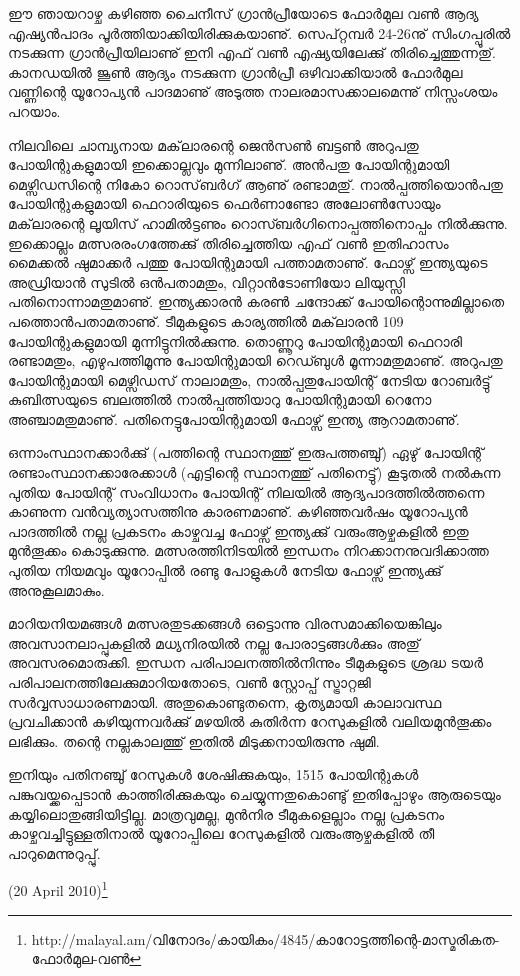 ﻿
\vskip 2pt

ഈ ഞായറാഴ്ച കഴിഞ്ഞ ചൈനീസ് ഗ്രാന്‍പ്രീയോടെ ഫോര്‍മുല വണ്‍ ആദ്യ എഷ്യന്‍പാദം പൂര്‍ത്തിയാക്കിയിരിക്കുകയാണു്. 
സെപ്റ്റമ്പര്‍ 24-26നു് സിംഗപ്പൂരില്‍ നടക്കുന്ന ഗ്രാന്‍പ്രീയിലാണു് ഇനി എഫ് വണ്‍ എഷ്യയിലേക്കു് തിരിച്ചെത്തുന്നതു്.
കാനഡയില്‍ ജൂണ്‍ ആദ്യം നടക്കുന്ന ഗ്രാന്‍പ്രീ ഒഴിവാക്കിയാല്‍ ഫോര്‍മുല വണ്ണിന്റെ യൂറോപ്യന്‍ പാദമാണു് അടുത്ത 
നാലരമാസക്കാലമെന്നു് നിസ്സംശയം പറയാം.

നിലവിലെ ചാമ്പ്യനായ മക്‌ലാരന്റെ ജെന്‍സണ്‍ ബട്ടണ്‍ അറുപതു പോയിന്റുകളുമായി ഇക്കൊല്ലവും മുന്നിലാണു്. 
അന്‍പതു പോയിന്റുമായി മെഴ്സിഡസിന്റെ നികോ റൊസ്‌ബര്‍ഗ് ആണു് രണ്ടാമതു്. നാല്‍പ്പത്തിയൊന്‍പതു പോയിന്റുകളുമായി 
ഫെറാരിയുടെ ഫെര്‍ണാണ്ടോ അലോണ്‍സോയും മക്‌ലാരന്റെ ലൂയിസ് ഹാമില്‍ട്ടണും റൊസ്ബര്‍ഗിനൊപ്പത്തിനൊപ്പം 
നില്‍ക്കുന്നു. ഇക്കൊല്ലം മത്സരരംഗത്തേക്കു് തിരിച്ചെത്തിയ എഫ് വണ്‍ ഇതിഹാസം മൈക്കല്‍ ഷുമാക്കര്‍ പത്തു 
പോയിന്റുമായി പത്താമതാണു്. ഫോഴ്സ് ഇന്ത്യയുടെ അഡ്രിയാന്‍ സുടില്‍ ഒന്‍പതാമതും, വിറ്റാന്‍ടോണിയോ ലിയുസ്സി 
പതിനൊന്നാമതുമാണു്. ഇന്ത്യക്കാരന്‍ കരണ്‍ ചന്ദോക്ക് പോയിന്റൊന്നുമില്ലാതെ പത്തൊന്‍പതാമതാണു്. ടീമുകളുടെ 
കാര്യത്തില്‍ മക്‌ലാരന്‍ 109 പോയിന്റുകളുമായി മുന്നിട്ടുനില്‍ക്കുന്നു. തൊണ്ണൂറു പോയിന്റുമായി ഫെറാരി രണ്ടാമതും, 
എഴുപത്തിമൂന്നു പോയിന്റുമായി റെഡ്ബുള്‍ മൂന്നാമതുമാണു്. അറുപതു പോയിന്റുമായി മെഴ്സിഡസ് നാലാമതും, 
നാല്‍പ്പതുപോയിന്റ് നേടിയ റോബര്‍ട്ടു് കുബിത്സയുടെ ബലത്തില്‍ നാല്‍പ്പത്തിയാറു പോയിന്റുമായി റെനോ 
അഞ്ചാമതുമാണു്. പതിനെട്ടുപോയിന്റുമായി ഫോഴ്സ് ഇന്ത്യ ആറാമതാണു്.

ഒന്നാംസ്ഥാനക്കാര്‍ക്കു് (പത്തിന്റെ സ്ഥാനത്തു് ഇരുപത്തഞ്ചു്) ഏഴു് പോയിന്റ് രണ്ടാംസ്ഥാനക്കാരേക്കാള്‍ (എട്ടിന്റെ 
സ്ഥാനത്തു് പതിനെട്ടു്) കൂടുതല്‍ നല്‍കുന്ന പുതിയ പോയിന്റ് സംവിധാനം പോയിന്റ് നിലയില്‍ ആദ്യപാദത്തില്‍ത്തന്നെ 
കാണുന്ന വന്‍വ്യത്യാസത്തിനു കാരണമാണു്. കഴിഞ്ഞവര്‍ഷം യൂറോപ്യന്‍ പാദത്തില്‍ നല്ല പ്രകടനം കാഴ്ചവച്ച 
ഫോഴ്സ് ഇന്ത്യക്കു് വരുംആഴ്ചകളില്‍ ഇതു മുന്‍തൂക്കം കൊടുക്കുന്നു. മത്സരത്തിനിടയില്‍ ഇന്ധനം നിറക്കാനനുവദിക്കാത്ത 
പുതിയ നിയമവും യൂറോപ്പില്‍ രണ്ടു പോളുകള്‍ നേടിയ ഫോഴ്സ് ഇന്ത്യക്കു് അനുകൂലമാകും.

മാറിയനിയമങ്ങള്‍ മത്സരതുടക്കങ്ങള്‍ ഒട്ടൊന്നു വിരസമാക്കിയെങ്കിലും അവസാനലാപ്പുകളില്‍ മധ്യനിരയില്‍ നല്ല 
പോരാട്ടങ്ങള്‍ക്കും അതു് അവസരമൊരുക്കി. ഇന്ധന പരിപാലനത്തില്‍നിന്നും ടീമുകളുടെ ശ്രദ്ധ ടയര്‍ 
പരിപാലനത്തിലേക്കുമാറിയതോടെ, വണ്‍ സ്റ്റോപ്പ് സ്ട്രാറ്റജി സര്‍‌വ്വസാധാരണമായി. അതുകൊണ്ടുതന്നെ, കൃത്യമായി 
കാലാവസ്ഥ പ്രവചിക്കാന്‍ കഴിയുന്നവര്‍ക്കു് മഴയില്‍ കുതിര്‍ന്ന റേസുകളില്‍ വലിയമുന്‍തൂക്കം ലഭിക്കും. തന്റെ നല്ലകാലത്തു് 
ഇതില്‍ മിടുക്കനായിരുന്നു ഷുമി.

ഇനിയും പതിനഞ്ചു് റേസുകള്‍ ശേഷിക്കുകയും, 1515 പോയിന്റുകള്‍ പങ്കുവയ്ക്കപ്പെടാന്‍ കാത്തിരിക്കുകയും ചെയ്യുന്നതുകൊണ്ടു് 
ഇതിപ്പോഴും ആരുടെയും കയ്യിലൊതുങ്ങിയിട്ടില്ല. മാത്രവുമല്ല, മുന്‍നിര ടീമുകളെല്ലാം നല്ല പ്രകടനം കാഴ്ചവച്ചിട്ടുള്ളതിനാല്‍ 
യൂറോപ്പിലെ റേസുകളില്‍ വരുംആഴ്ചകളില്‍ തീ പാറുമെന്നുറുപ്പു്. 

(20 April 2010)\footnote{http://malayal.am/വിനോദം/കായികം/4845/കാറോട്ടത്തിന്റെ-മാസ്മരികത-ഫോര്‍മുല-വണ്‍}

\newpage
